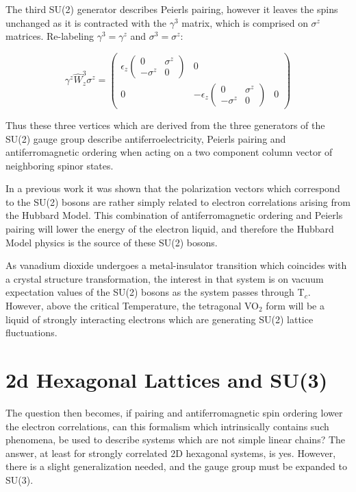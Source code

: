 \documentclass[prb,showpacs,superscriptaddress,titlepage,amsmath,amssymb,twocolumn]{revtex4-1}
\begin{document}
The third SU(2) generator describes Peierls pairing, however it leaves the spins unchanged as it is contracted with the $\gamma^{3}$ matrix, which is comprised on $\sigma^{z}$ matrices. Re-labeling $\gamma^{3} = \gamma^{z}$ and $\sigma^{3} = \sigma^{z}$:

\begin{equation}
\gamma^{z}\hat{W}^{3}_{z}\sigma^{z} = \begin{pmatrix}\epsilon_{z}\begin{pmatrix}0&\sigma^{z}\\-\sigma^{z}&0\end{pmatrix}&0\\0&-\epsilon_{z}\begin{pmatrix}0&\sigma^{z}\\-\sigma^{z}&0\end{pmatrix}&0\end{pmatrix}
\end{equation}

Thus these three vertices which are derived from the three generators of the SU(2) gauge group describe antiferroelectricity, Peierls pairing and antiferromagnetic ordering when acting on a two component column vector of neighboring spinor states. 

In a previous work it was shown that the polarization vectors which correspond to the SU(2) bosons are rather simply related to electron correlations arising from the Hubbard Model\cite{Booth_Wilson_2020}. This combination of antiferromagnetic ordering and Peierls pairing will lower the energy of the electron liquid, and therefore the Hubbard Model physics is the source of these SU(2) bosons.

As vanadium dioxide undergoes a metal-insulator transition which coincides with a crystal structure transformation, the interest in that system is on vacuum expectation values of the SU(2) bosons as the system passes through T$_{c}$. However, above the critical Temperature, the  tetragonal VO$_{2}$ form will be a liquid of strongly interacting electrons which are generating SU(2) lattice fluctuations. 

\section{2d Hexagonal Lattices and SU(3)}
The question then becomes, if pairing and antiferromagnetic spin ordering lower the electron correlations, can this formalism which intrinsically contains such phenomena, be used to describe systems which are not simple linear chains? The answer, at least for strongly correlated 2D hexagonal systems, is yes. However, there is a slight generalization needed, and the gauge group must be expanded to SU(3).
\end{document}
